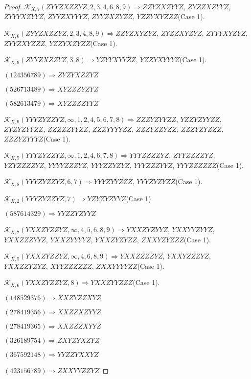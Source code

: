\documentclass[12pt]{article}
\theoremstyle{plain}
\theoremstyle{definition}
\theoremstyle{remark}
\newcommand{\fancy}[1]{\mathcal{#1}}
\def\K{\fancy{K}}
\begin{document}
\begin{proof}
	$\K_{X,7}(ZYYZXZZYZ,2, 3, 4, 6, 8, 9)\Rightarrow $$ZZYZXZYYZ$, $ZYZZXZYYZ$, $ZYYYXZYYZ$, $ZYYZXYYYZ$, $ZYYZXZYZZ$, $YZZYXYZZZ$(Case 1).
	
	$\K_{X,6}(ZYYZXZZYZ,2, 3, 4, 8, 9)\Rightarrow $$ZZYZXYZYZ$, $ZYZZXYZYZ$, $ZYYYXYZYZ$, $ZYYZXYZZZ$, $YZZYXZYZZ$(Case 1).
	
	$\K_{X,9}(ZYYZXZZYZ,3, 8)\Rightarrow $$YZYYXYYZZ$, $YZZYXYYYZ$(Case 1).
	
	
	
	$(1 2 4 3 5 6 7 8 9)\Rightarrow ZYZYXZZYZ$
	
	$(5 2 6 7 1 3 4 8 9)\Rightarrow XYZZZYZYZ$
	
	$(5 8 2 6 1 3 4 7 9)\Rightarrow XYZZZZYYZ$
	
	
	
	$\K_{X,9}(YYYZYZZYZ,\infty,1, 2, 4, 5, 6, 7, 8)\Rightarrow $$ZZZYZYYZZ$, $YZZYZYYZZ$, $ZYZYZYYZZ$, $ZZZZZYYZZ$, $ZZZYYYYZZ$, $ZZZYZZYZZ$, $ZZZYZYZZZ$, $ZZZYZYYYZ$(Case 1).
	
	$\K_{X,5}(YYYZYZZYZ,\infty,1, 2, 4, 6, 7, 8)\Rightarrow $$YYYZZZZYZ$, $ZYYZZZZYZ$, $YZYZZZZYZ$, $YYYYZZZYZ$, $YYYZZYZYZ$, $YYYZZZYYZ$, $YYYZZZZZZ$(Case 1).
	
	$\K_{X,8}(YYYZYZZYZ,6, 7)\Rightarrow $$YYYZYYZZZ$, $YYYZYZYZZ$(Case 1).
	
	$\K_{X,2}(YYYZYZZYZ,7)\Rightarrow $$YZYZYZYYZ$(Case 1).
	
	
	
	$(5 8 7 6 1 4 3 2 9)\Rightarrow YYZZYZYYZ$
	
	
	
	$\K_{X,7}(YXXZYZZYZ,\infty,4, 5, 6, 8, 9)\Rightarrow $$YXXZYZYYZ$, $YXXYYZYYZ$, $YXXZZZYYZ$, $YXXZYYYYZ$, $YXXZYZYZZ$, $ZXXYZYZZZ$(Case 1).
	
	$\K_{X,5}(YXXZYZZYZ,\infty,4, 6, 8, 9)\Rightarrow $$YXXZZZZYZ$, $YXXYZZZYZ$, $YXXZZYZYZ$, $XYYZZZZZZ$, $ZXXYYYYZZ$(Case 1).
	
	$\K_{X,6}(YXXZYZZYZ,8)\Rightarrow $$YXXZYYZZZ$(Case 1).
	
	
	
	$(1 4 8 5 2 9 3 7 6)\Rightarrow XXZYZZXYZ$
	
	$(2 7 8 4 1 9 3 5 6)\Rightarrow XXZZXZYYZ$
	
	$(2 7 8 4 1 9 3 6 5)\Rightarrow XXZZZXYYZ$
	
	$(3 2 6 1 8 9 7 5 4)\Rightarrow ZXYZYXZYZ$
	
	$(3 6 7 5 9 2 1 4 8)\Rightarrow YYZZYXXYZ$
	
	$(4 2 3 1 5 6 7 8 9)\Rightarrow ZXXYYZZYZ$
	

\end{proof}
\end{document}
